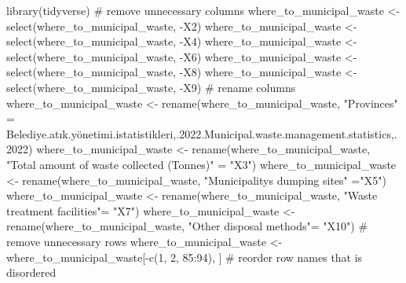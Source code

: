 \documentclass[
  11pt,
  a4paper,
  DIV=11,
  numbers=noendperiod]{scrartcl}
\newenvironment{Shaded}{\begin{snugshade}}{\end{snugshade}}
\newcommand{\AttributeTok}[1]{\textcolor[rgb]{0.40,0.45,0.13}{#1}}
\newcommand{\CommentTok}[1]{\textcolor[rgb]{0.37,0.37,0.37}{#1}}
\newcommand{\DecValTok}[1]{\textcolor[rgb]{0.68,0.00,0.00}{#1}}
\newcommand{\FunctionTok}[1]{\textcolor[rgb]{0.28,0.35,0.67}{#1}}
\newcommand{\NormalTok}[1]{\textcolor[rgb]{0.00,0.23,0.31}{#1}}
\newcommand{\OtherTok}[1]{\textcolor[rgb]{0.00,0.23,0.31}{#1}}
\newcommand{\SpecialCharTok}[1]{\textcolor[rgb]{0.37,0.37,0.37}{#1}}
\newcommand{\StringTok}[1]{\textcolor[rgb]{0.13,0.47,0.30}{#1}}
\begin{document}
\begin{Shaded}
\begin{Highlighting}[]
\FunctionTok{library}\NormalTok{(tidyverse)}
\CommentTok{\# remove unnecessary columns}
\NormalTok{where\_to\_municipal\_waste }\OtherTok{\textless{}{-}} \FunctionTok{select}\NormalTok{(where\_to\_municipal\_waste, }\SpecialCharTok{{-}}\NormalTok{X2)    }
\NormalTok{where\_to\_municipal\_waste }\OtherTok{\textless{}{-}} \FunctionTok{select}\NormalTok{(where\_to\_municipal\_waste, }\SpecialCharTok{{-}}\NormalTok{X4)}
\NormalTok{where\_to\_municipal\_waste }\OtherTok{\textless{}{-}} \FunctionTok{select}\NormalTok{(where\_to\_municipal\_waste, }\SpecialCharTok{{-}}\NormalTok{X6)}
\NormalTok{where\_to\_municipal\_waste }\OtherTok{\textless{}{-}} \FunctionTok{select}\NormalTok{(where\_to\_municipal\_waste, }\SpecialCharTok{{-}}\NormalTok{X8)}
\NormalTok{where\_to\_municipal\_waste }\OtherTok{\textless{}{-}} \FunctionTok{select}\NormalTok{(where\_to\_municipal\_waste, }\SpecialCharTok{{-}}\NormalTok{X9)}
\CommentTok{\# rename columns}
\NormalTok{where\_to\_municipal\_waste }\OtherTok{\textless{}{-}} \FunctionTok{rename}\NormalTok{(where\_to\_municipal\_waste, }\StringTok{"Provinces"} \OtherTok{=} \StringTok{\textasciigrave{}}\AttributeTok{Belediye.atık.yönetimi.istatistikleri,.2022.Municipal.waste.management.statistics,.2022}\StringTok{\textasciigrave{}}\NormalTok{)}
\NormalTok{where\_to\_municipal\_waste }\OtherTok{\textless{}{-}} \FunctionTok{rename}\NormalTok{(where\_to\_municipal\_waste, }\StringTok{"Total amount of waste collected  (Tonnes)"} \OtherTok{=} \StringTok{"X3"}\NormalTok{)}
\NormalTok{where\_to\_municipal\_waste }\OtherTok{\textless{}{-}} \FunctionTok{rename}\NormalTok{(where\_to\_municipal\_waste, }\StringTok{"Municipality\textquotesingle{}s dumping sites"} \OtherTok{=}\StringTok{"X5"}\NormalTok{)}
\NormalTok{where\_to\_municipal\_waste }\OtherTok{\textless{}{-}} \FunctionTok{rename}\NormalTok{(where\_to\_municipal\_waste, }\StringTok{"Waste treatment facilities"}\OtherTok{=} \StringTok{"X7"}\NormalTok{)}
\NormalTok{where\_to\_municipal\_waste }\OtherTok{\textless{}{-}} \FunctionTok{rename}\NormalTok{(where\_to\_municipal\_waste, }\StringTok{"Other disposal methods"}\OtherTok{=} \StringTok{"X10"}\NormalTok{)}
\CommentTok{\# remove unnecessary rows}
\NormalTok{where\_to\_municipal\_waste }\OtherTok{\textless{}{-}}\NormalTok{ where\_to\_municipal\_waste[}\SpecialCharTok{{-}}\FunctionTok{c}\NormalTok{(}\DecValTok{1}\NormalTok{, }\DecValTok{2}\NormalTok{, }\DecValTok{85}\SpecialCharTok{:}\DecValTok{94}\NormalTok{), ]}
\CommentTok{\# reorder row names that is disordered}

\end{Highlighting}
\end{Shaded}
\end{document}
